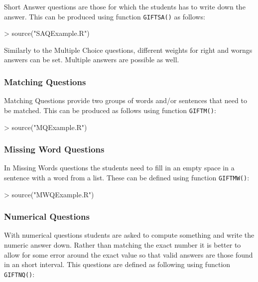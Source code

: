 \documentclass[a4paper]{article}
\newcommand{\code}[1]{\texttt{#1}}
\begin{document}
Short Answer questions are those for which the students has to write down the 
answer. This can be produced using function \code{GIFTSA()} as follows:


\begin{Schunk}
\begin{Sinput}
> source("SAQExample.R")
\end{Sinput}
\end{Schunk}

Similarly to the Multiple Choice questions, different weights for right and
worngs answers can be set. Multiple answers are possible as well.

\subsubsection{Matching Questions}

Matching Questions provide two groups of words and/or sentences that need
to be matched. This can be produced as follows using function \code{GIFTM()}:


\begin{Schunk}
\begin{Sinput}
> source("MQExample.R")
\end{Sinput}
\end{Schunk}

\subsubsection{Missing Word Questions}

In Missing Words questions the students need to fill in an empty space
in a sentence with a word from a list. These can be defined
using function \code{GIFTMW()}:



\begin{Schunk}
\begin{Sinput}
> source("MWQExample.R")
\end{Sinput}
\end{Schunk}



\subsubsection{Numerical Questions}

With  numerical questions students are asked to compute something and write the
numeric answer down. Rather than matching the exact number it is better to
allow for some error around the exact value so that valid answers are those
found in an short interval. This questions are defined as following using
function \code{GIFTNQ()}:
\end{document}

